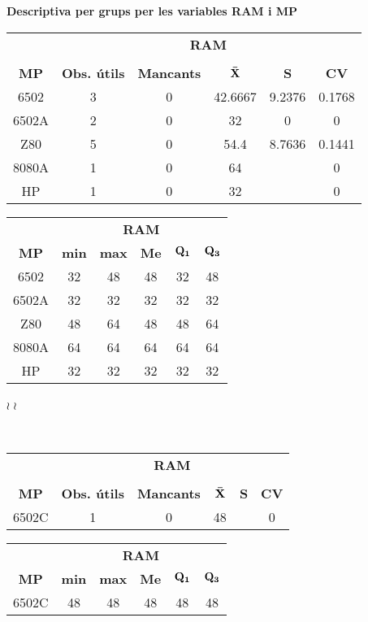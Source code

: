 \begin{center}
{\bf Descriptiva per grups per les variables RAM i MP }\vspace{0.5em}
 
\begin{tabular}{|c||c|c|c|c|c|}
\hline
&\multicolumn{5}{|c|}{\bf RAM}\\
\cline{2-6}
 &  &  &  &  & \\  [-2.4ex]
{\bf MP} & {\bf Obs. \'utils} & {\bf Mancants } & $\bf \bar{X}$& {\bf  S}& {\bf  CV}\\
\hline\hline
6502 & 3 & 0 & 42.6667 & 9.2376 & 0.1768 \\
\hline
6502A & 2 & 0 & 32 & 0 & 0 \\
\hline
Z80 & 5 & 0 & 54.4 & 8.7636 & 0.1441 \\
\hline
8080A & 1 & 0 & 64 &   & 0 \\
\hline
HP & 1 & 0 & 32 &   & 0 \\
\hline
\end{tabular}
 
\vfill
 
\begin{tabular}{|c||c|c|c|c|c|}
\hline
&\multicolumn{5}{|c|}{\bf RAM}\\
\cline{2-6}
{\bf MP}  & {\bf min } & {\bf max } & {\bf Me} & $\bf  Q_{1}$ &  $\bf Q_{3}$\\
\hline\hline
6502 & 32 & 48 & 48 & 32 & 48 \\
\hline
6502A & 32 & 32 & 32 & 32 & 32 \\
\hline
Z80 & 48 & 64 & 48 & 48 & 64 \\
\hline
8080A & 64 & 64 & 64 & 64 & 64 \\
\hline
HP & 32 & 32 & 32 & 32 & 32 \\
\hline
\end{tabular}

{\hspace{-8.5cm} \large $\wr$}
\newpage
{\hspace{-8.5cm} \large $\wr$}

\mbox{ }
\begin{tabular}{|c||c|c|c|c|c|}
\hline
&\multicolumn{5}{|c|}{\bf RAM}\\
\cline{2-6}
 &  &  &  &  & \\  [-2.4ex]
{\bf MP} & {\bf Obs. \'utils} & {\bf Mancants } & $\bf \bar{X}$& {\bf  S}& {\bf  CV}\\
\hline\hline
6502C & 1 & 0 & 48 &   & 0 \\
\hline
\end{tabular}
 
\vfill
 
\begin{tabular}{|c||c|c|c|c|c|}
\hline
&\multicolumn{5}{|c|}{\bf RAM}\\
\cline{2-6}
{\bf MP}  & {\bf min } & {\bf max } & {\bf Me} & $\bf  Q_{1}$ &  $\bf Q_{3}$\\
\hline\hline
6502C & 48 & 48 & 48 & 48 & 48 \\
\hline
\end{tabular}
\end{center}
\vfill

